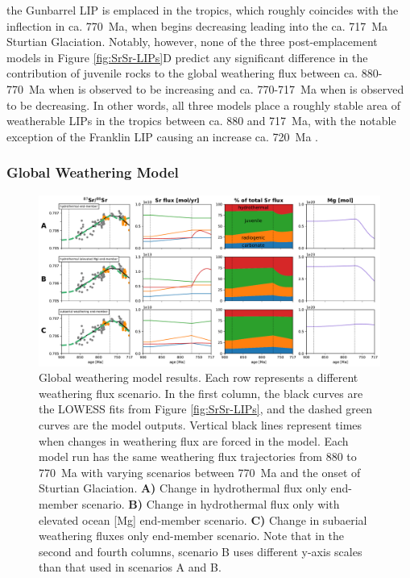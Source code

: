 the Gunbarrel LIP is emplaced in the tropics, which roughly coincides with the inflection in \SrSr ca. 770~Ma, when \SrSr begins decreasing leading into the ca. 717~Ma Sturtian Glaciation. Notably, however, none of the three post-emplacement models in Figure \ref{fig:SrSr-LIPs}D predict any significant difference in the contribution of juvenile rocks to the global weathering flux between ca. 880-770~Ma when \SrSr is observed to be increasing and ca. 770-717~Ma when \SrSr is observed to be decreasing. In other words, all three models place a roughly stable area of weatherable LIPs in the tropics between ca. 880 and 717~Ma, with the notable exception of the Franklin LIP causing an increase ca. 720~Ma \citep{Denyszyn2009a}.

\subsubsection{Global Weathering Model}

\begin{figure}[h!]
\begin{center}
	\includegraphics[width=\textwidth]{figures/Tambien/Sr-model-flux-changes.pdf}
	\caption[Tonian global weathering model.]{Global weathering model results. Each row represents a different weathering flux scenario. In the first column, the black curves are the LOWESS fits from Figure \ref{fig:SrSr-LIPs}, and the dashed green curves are the model outputs. Vertical black lines represent times when changes in weathering flux are forced in the model. Each model run has the same weathering flux trajectories from 880 to 770~Ma with varying scenarios between 770~Ma and the onset of Sturtian Glaciation. \textbf{A)} Change in hydrothermal flux only end-member scenario. \textbf{B)} Change in hydrothermal flux only with elevated ocean [Mg] end-member scenario. \textbf{C)} Change in subaerial weathering fluxes only end-member scenario. Note that in the second and fourth columns, scenario B uses different y-axis scales than that used in scenarios A and B.}
	\label{fig:Sr-model-flux-changes}
\end{center}
\end{figure}

